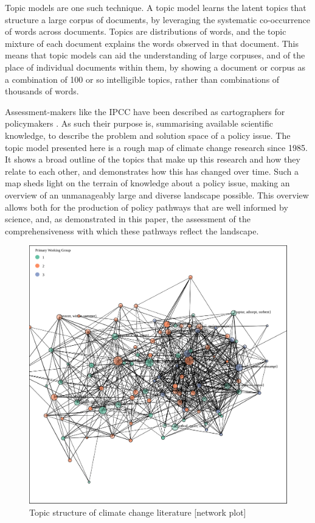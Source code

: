 \documentclass{article}
\begin{document}
Topic models are one such technique. A topic model learns the latent topics that structure a large corpus of documents, by leveraging the systematic co-occurrence of words across documents. Topics are distributions of words, and the topic mixture of each document explains the words observed in that document. This means that topic models can aid the understanding of large corpuses, and of the place of individual documents within them, by showing a document or corpus as a combination of 100 or so intelligible topics, rather than combinations of thousands of words.

Assessment-makers like the IPCC have been described as cartographers for policymakers \citep{Edenhofer2015}. As such their purpose is, summarising available scientific knowledge, to describe the problem and solution space of a policy issue. The topic model presented here is a rough map of climate change research since 1985. It shows a broad outline of the topics that make up this research and how they relate to each other, and demonstrates how this has changed over time. Such a map sheds light on the terrain of knowledge about a policy issue, making an overview of an unmanageably large and diverse landscape possible. This overview allows both for the production of policy pathways that are well informed by science, and, as demonstrated in this paper, the assessment of the comprehensiveness with which these pathways reflect the landscape.


\begin{figure}
	\includegraphics[width=\linewidth]{plots/network_wg_65.svg}
    \caption{Topic structure of climate change literature [network plot]}
    \label{network}
\end{figure}
\end{document}
